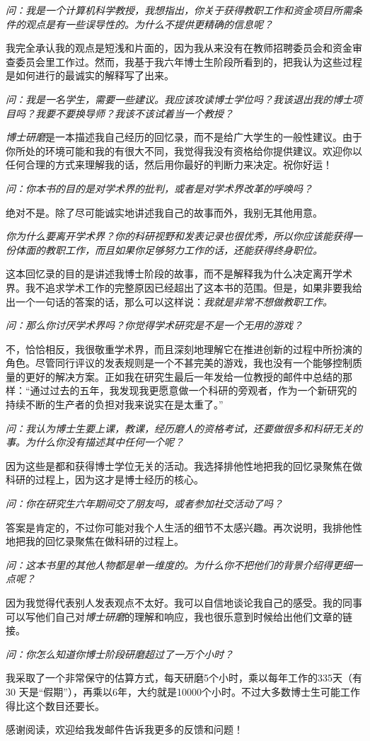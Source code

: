 \documentclass[12pt,UTF8,nofonts]{book}
\newcommand{\bookname}{博士研磨}
\begin{document}
\emph{问：我是一个计算机科学教授，我想指出，你关于获得教职工作和资金项目所需条件的观点是有一些误导性的。为什么不提供更精确的信息呢？}

我完全承认我的观点是短浅和片面的，因为我从来没有在教师招聘委员会和资金审查委员会里工作过。然而，我基于我六年博士生阶段所看到的，把我认为这些过程是如何进行的最诚实的解释写了出来。

\emph{问：我是一名学生，需要一些建议。我应该攻读博士学位吗？我该退出我的博士项目吗？我要不要换导师？我该不该试着当一个教授？}

\emph{\bookname}是一本描述我自己经历的回忆录，而不是给广大学生的一般性建议。由于你所处的环境可能和我的有很大不同，我觉得我没有资格给你提供建议。欢迎你以任何合理的方式来理解我的话，然后用你最好的判断力来决定。祝你好运！

\emph{问：你本书的目的是对学术界的批判，或者是对学术界改革的呼唤吗？}

绝对不是。除了尽可能诚实地讲述我自己的故事而外，我别无其他用意。

\emph{你为什么要离开学术界？你的科研视野和发表记录也很优秀，所以你应该能获得一份体面的教职工作，而且如果你足够努力工作的话，还能获得终身职位。}

这本回忆录的目的是讲述我博士阶段的故事，而不是解释我为什么决定离开学术界。我不追求学术工作的完整原因已经超出了这本书的范围。但是，如果非要我给出一个一句话的答案的话，那么可以这样说：\emph{我就是非常不想做教职工作。}

\emph{问：那么你讨厌学术界吗？你觉得学术研究是不是一个无用的游戏？}

不，恰恰相反，我很敬重学术界，而且深刻地理解它在推进创新的过程中所扮演的角色。尽管同行评议的发表规则是一个不甚完美的游戏，我也没有一个能够控制质量的更好的解决方案。正如我在研究生最后一年发给一位教授的邮件中总结的那样：“通过过去的五年，我发现我更愿意做一个科研的旁观者，作为一个新研究的持续不断的生产者的负担对我来说实在是太重了。”

\emph{问：我认为博士生要上课，教课，经历磨人的资格考试，还要做很多和科研无关的事。为什么你没有描述其中任何一个呢？}

因为这些是都和获得博士学位无关的活动。我选择排他性地把我的回忆录聚焦在做科研的过程上，因为这才是博士经历的核心。

\emph{问：你在研究生六年期间交了朋友吗，或者参加社交活动了吗？}

答案是肯定的，不过你可能对我个人生活的细节不太感兴趣。再次说明，我排他性地把我的回忆录聚焦在做科研的过程上。

\emph{问：这本书里的其他人物都是单一维度的。为什么你不把他们的背景介绍得更细一点呢？}

因为我觉得代表别人发表观点不太好。我可以自信地谈论我自己的感受。我的同事可以写他们自己对\emph{\bookname}的理解和响应，我也很乐意到时候给出他们文章的链接。

\emph{问：你怎么知道你博士阶段研磨超过了一万个小时？}

我采取了一个非常保守的估算方式，每天研磨5个小时，乘以每年工作的335天（有30 天是“假期”），再乘以6年，大约就是10000个小时。不过大多数博士生可能工作得比这个数目还要长。

感谢阅读，欢迎给我发邮件告诉我更多的反馈和问题！

\clearpage
\clearpage
\end{document}
